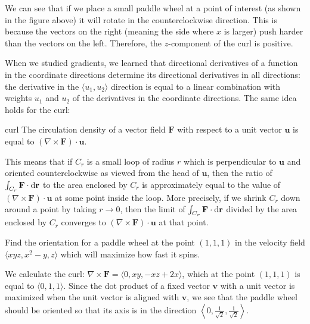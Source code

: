 \documentclass[prettycode,shellescape]{watsonbook}
\begin{document}
\begin{solution}
  We can see that if we place a small paddle wheel at a point of
  interest (as shown in the figure above) it will rotate in the
  counterclockwise direction. This is because the vectors on the right
  (meaning the side where $x$ is larger) push harder than the vectors
  on the left. Therefore, the $z$-component of the curl is
  $\boxed{\text{positive}}$.
\end{solution}

When we studied gradients, we learned that directional derivatives of
a function in the coordinate directions determine its directional
derivatives in all directions: the derivative in the
$\langle u_1, u_2 \rangle$ direction is equal to a linear combination
with weights $u_1$ and $u_2$ of the derivatives in the coordinate
directions. The same idea holds for the curl:
\begin{theo}{}{curl} \bang{-3mm} The circulation density of a vector
  field $\mathbf{F}$ with respect to a unit vector $\mathbf{u} $ is
  equal to $\left(\nabla \times \mathbf{F}\right) \cdot
  \mathbf{u}$.
\end{theo}


This means that if $C_r$ is a small loop of radius $r$ which is
perpendicular to $\mathbf{u}$ and oriented counterclockwise as viewed
from the head of $\mathbf{u}$, then the ratio of
$\int_{C_r} \mathbf{F} \cdot \mathrm{d}\mathbf{r}$ to the area enclosed by
$C_r$ is approximately equal to the value of
$\left(\nabla \times \mathbf{F}\right) \cdot \mathbf{u}$ at some point
inside the loop. More precisely, if we shrink $C_r$ down around a
point by taking $r \to 0$, then the limit of
$\int_{C_r} \mathbf{F} \cdot \mathrm{d}\mathbf{r}$ divided by the area
enclosed by $C_r$ converges to
$\left(\nabla \times \mathbf{F}\right) \cdot \mathbf{u}$ at that
point.
\begin{example}{}{}
  Find the orientation for a paddle wheel at the point $(1,1,1)$ in
  the velocity field $\langle xyz,x^2 - y, z \rangle$ which will
  maximize how fast it spins.
\end{example}

\begin{solution}
  We calculate the curl:
  $\nabla \times \mathbf{F} = \langle 0, xy, -xz + 2x \rangle$, which
  at the point $(1,1,1)$ is equal to $\langle 0,1,1 \rangle$. Since
  the dot product of a fixed vector $\mathbf{v}$ with a unit vector is
  maximized when the unit vector is aligned with $\mathbf{v}$, we see
  that the paddle wheel should be oriented so that its axis is in the
  direction
  $\boxed{\left\langle 0, \tfrac{1}{\sqrt{2}}, \tfrac{1}{\sqrt{2}} \right\rangle}$.
\end{solution}
\end{document}
